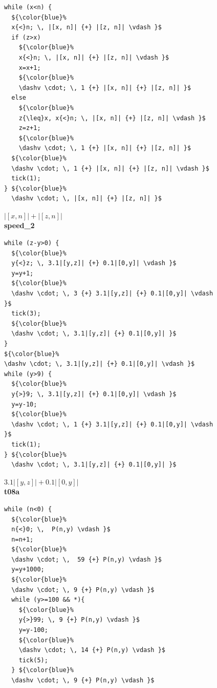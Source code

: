 \documentclass[nocopyrightspace,preprint,pldi]{sigplanconf-pldi15}
\begin{document}
\begin{figure}
\begin{minipage}[b]{\progwidth}
\begin{center}
\begin{lstlisting}
while (x<n) {
  ${\color{blue}%
  x{<}n; \, |[x, n]| {+} |[z, n]| \vdash }$
  if (z>x)
    ${\color{blue}%
    x{<}n; \, |[x, n]| {+} |[z, n]| \vdash }$
    x=x+1;
    ${\color{blue}%
    \dashv \cdot; \, 1 {+} |[x, n]| {+} |[z, n]| }$
  else
    ${\color{blue}%
    z{\leq}x, x{<}n; \, |[x, n]| {+} |[z, n]| \vdash }$
    z=z+1;
    ${\color{blue}%
    \dashv \cdot; \, 1 {+} |[x, n]| {+} |[z, n]| }$
  ${\color{blue}%
  \dashv \cdot; \, 1 {+} |[x, n]| {+} |[z, n]| \vdash }$
  tick(1);
} ${\color{blue}%
  \dashv \cdot; \, |[x, n]| {+} |[z, n]| }$
   \end{lstlisting}
\vspace{-2.5ex}
$|[x, n]| + |[z, n]|$
\\[.4\baselineskip]
      {\bf speed\_2}
    \end{center}
  \end{minipage}
%
\hfill
%
  \begin{minipage}[b]{\progwidth}
    \begin{center}
   \begin{lstlisting}
while (z-y>0) {
  ${\color{blue}%
  y{<}z; \, 3.1|[y,z]| {+} 0.1|[0,y]| \vdash }$
  y=y+1;
  ${\color{blue}%
  \dashv \cdot; \, 3 {+} 3.1|[y,z]| {+} 0.1|[0,y]| \vdash }$
  tick(3);
  ${\color{blue}%
  \dashv \cdot; \, 3.1|[y,z]| {+} 0.1|[0,y]| }$
}
${\color{blue}%
\dashv \cdot; \, 3.1|[y,z]| {+} 0.1|[0,y]| \vdash }$
while (y>9) {
  ${\color{blue}%
  y{>}9; \, 3.1|[y,z]| {+} 0.1|[0,y]| \vdash }$
  y=y-10;
  ${\color{blue}%
  \dashv \cdot; \, 1 {+} 3.1|[y,z]| {+} 0.1|[0,y]| \vdash }$
  tick(1);
} ${\color{blue}%
  \dashv \cdot; \, 3.1|[y,z]| {+} 0.1|[0,y]| }$
   \end{lstlisting}
\vspace{-2.5ex}
$3.1|[y,z]| + 0.1|[0,y]|$
\\[.4\baselineskip]
      {\bf t08a}
    \end{center}
  \end{minipage}
%
\hfill
%
%
%
  \begin{minipage}[b]{\progwidth}
    \begin{center}
   \begin{lstlisting}
while (n<0) {
  ${\color{blue}%
  n{<}0; \,  P(n,y) \vdash }$
  n=n+1;
  ${\color{blue}%
  \dashv \cdot; \,  59 {+} P(n,y) \vdash }$
  y=y+1000;
  ${\color{blue}%
  \dashv \cdot; \, 9 {+} P(n,y) \vdash }$
  while (y>=100 && *){
    ${\color{blue}%
    y{>}99; \, 9 {+} P(n,y) \vdash }$
    y=y-100;
    ${\color{blue}%
    \dashv \cdot; \, 14 {+} P(n,y) \vdash }$
    tick(5);
  } ${\color{blue}%
  \dashv \cdot; \, 9 {+} P(n,y) \vdash }$

\end{lstlisting}
\end{center}
\end{minipage}
\end{figure}
\end{document}

